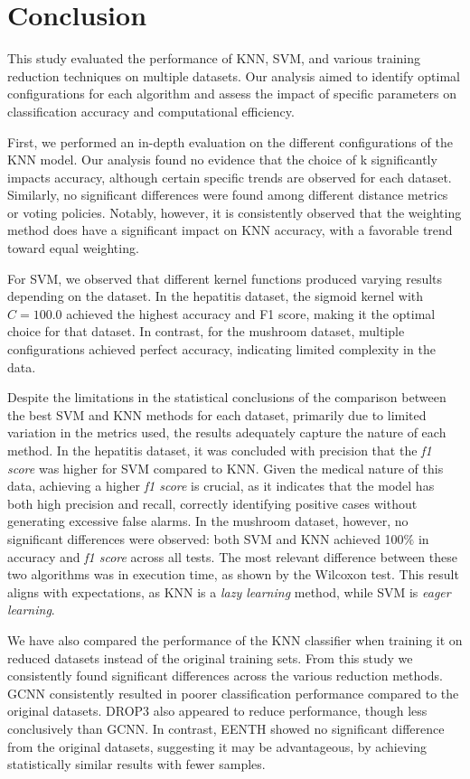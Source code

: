 \section{Conclusion}

This study evaluated the performance of KNN, SVM, and various training reduction techniques on multiple datasets. Our analysis aimed to identify optimal configurations for each algorithm and assess the impact of specific parameters on classification accuracy and computational efficiency.

First, we performed an in-depth evaluation on the different configurations of the KNN model. Our analysis found no evidence that the choice of k significantly impacts accuracy, although certain specific trends are observed for each dataset. Similarly, no significant differences were found among different distance metrics or voting policies. Notably, however, it is consistently observed that the weighting method does have a significant impact on KNN accuracy, with a favorable trend toward equal weighting.

For SVM, we observed that different kernel functions produced varying results depending on the dataset. In the hepatitis dataset, the sigmoid kernel with $C=100.0$ achieved the highest accuracy and F1 score, making it the optimal choice for that dataset. In contrast, for the mushroom dataset, multiple configurations achieved perfect accuracy, indicating limited complexity in the data.

Despite the limitations in the statistical conclusions of the comparison between the best SVM and KNN methods for each dataset, primarily due to limited variation in the metrics used, the results adequately capture the nature of each method. In the hepatitis dataset, it was concluded with precision that the \textit{f1 score} was higher for SVM compared to KNN. Given the medical nature of this data, achieving a higher \textit{f1 score} is crucial, as it indicates that the model has both high precision and recall, correctly identifying positive cases without generating excessive false alarms. In the mushroom dataset, however, no significant differences were observed: both SVM and KNN achieved 100$\%$ in accuracy and \textit{f1 score} across all tests. The most relevant difference between these two algorithms was in execution time, as shown by the Wilcoxon test. This result aligns with expectations, as KNN is a \textit{lazy learning} method, while SVM is \textit{eager learning}.

We have also compared the performance of the KNN classifier when training it on reduced datasets instead of the original training sets. From this study we consistently found significant differences across the various reduction methods. GCNN consistently resulted in poorer classification performance compared to the original datasets. DROP3 also appeared to reduce performance, though less conclusively than GCNN. In contrast, EENTH showed no significant difference from the original datasets, suggesting it may be advantageous, by achieving statistically similar results with fewer samples.

